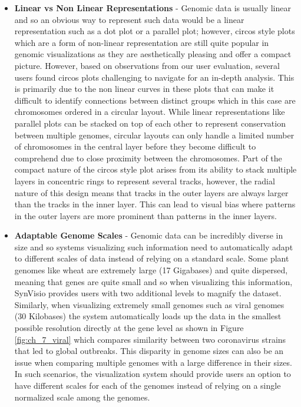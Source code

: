 \begin{itemize}
    \item \textbf{Linear vs Non Linear Representations} - Genomic data is usually linear and so an obvious way to represent such data would be a linear representation such as a dot plot or a parallel plot; however, circos style plots which are a form of non-linear representation are still quite popular in genomic visualizations as they are aesthetically pleasing and offer a compact picture. However, based on observations from our user evaluation, several users found circos plots challenging to navigate for an in-depth analysis. This is primarily due to the non linear curves in these plots that can make it difficult to identify connections between distinct groups which in this case are chromosomes ordered in a circular layout. While linear representations like parallel plots can be stacked on top of each other to represent conservation between multiple genomes, circular layouts can only handle a limited number of chromosomes in the central layer before they become difficult to comprehend due to close proximity between the chromosomes. Part of the compact nature of the circos style plot arises from its ability to stack multiple layers in concentric rings to represent several tracks, however, the radial nature of this design means that tracks in the outer layers are always larger than the tracks in the inner layer. This can lead to visual bias where patterns in the outer layers are more prominent than patterns in the inner layers.
    
    \item \textbf{Adaptable Genome Scales} - Genomic data can be incredibly diverse in size and so systems visualizing such information need to automatically adapt to different scales of data instead of relying on a standard scale. Some plant genomes like wheat are extremely large (17 Gigabases) and quite dispersed, meaning that genes are quite small and so when visualizing this information, SynVisio provides users with two additional levels to magnify the dataset. Similarly, when visualizing extremely small genomes such as viral genomes (30 Kilobases) the system automatically loads up the data in the smallest possible resolution directly at the gene level as shown in Figure \ref{fig:ch_7_viral} which compares similarity between two coronavirus strains that led to global outbreaks. This disparity in genome sizes can also be an issue when comparing multiple genomes with a large difference in their sizes. In such scenarios, the visualization system should provide users an option to have different scales for each of the genomes instead of relying on a single normalized scale among the genomes. 
\end{itemize}

